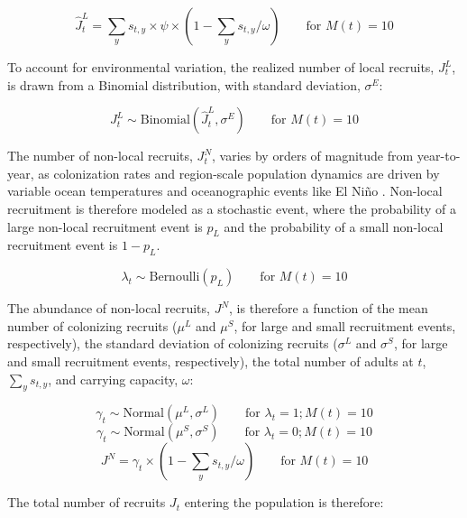 \documentclass{article}
\begin{document}
\begin{equation}
\hat{J}^L_t = \sum_ys_{t,y}\times \psi \times (1-\sum_ys_{t,y}/\omega) \qquad \text{for } M(t) =10
\end{equation}

To account for environmental variation, the realized number of local recruits, $J^L_t$, is drawn from a Binomial distribution, with standard deviation, $\sigma^E$:

\begin{equation}
J_t^L \sim \text{Binomial}(\hat{J}^L_t, \sigma^E) \qquad \text{for } M(t) =10
\end{equation}

The number of non-local recruits, $J^N_t$, varies by orders of magnitude from year-to-year, as colonization rates and region-scale population dynamics are driven by variable ocean temperatures and oceanographic events like El Niño \parencite{yamada2021ocean, keller2026integrated}. Non-local recruitment is therefore modeled as a stochastic event, where the probability of a large non-local recruitment event is $p_L$ and the probability of a small non-local recruitment event is $1-p_L$. 

\begin{equation}
\lambda_t \sim \text{Bernoulli}(p_L) \qquad \text{for } M(t) =10
\end{equation}

The abundance of non-local recruits, $J^N$, is therefore a function of the mean number of colonizing recruits ($\mu^L$ and $\mu^S$, for large and small recruitment events, respectively), the standard deviation of colonizing recruits ($\sigma^L$ and $\sigma^S$, for large and small recruitment events, respectively), the total number of adults at $t$, $\sum_ys_{t,y}$, and carrying capacity, $\omega$:

\begin{equation}
\gamma_t \sim \text{Normal}(\mu^L,\sigma^L) \qquad \text{for } \lambda_t =1; M(t) =10
\end{equation}
\begin{equation}
\gamma_t \sim \text{Normal}(\mu^S,\sigma^S) \qquad \text{for } \lambda_t =0; M(t) =10
\end{equation}
\begin{equation}
J^N = \gamma_t \times (1 - \sum_ys_{t,y} / \omega) \qquad \text{for } M(t) =10
\end{equation}

The total number of recruits $J_t$ entering the population is therefore:
\end{document}
